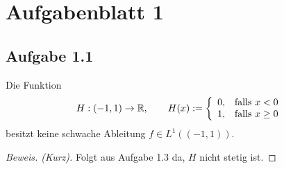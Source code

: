 
\section{Aufgabenblatt 1}
\subsection{Aufgabe 1.1}
Die Funktion
\begin{align*}
	H:(-1,1)\to\mathbb{R},\qquad H(x):=\left\lbrace\begin{array}{cl}
		0, & \text{falls } x<0\\
		1, & \text{falls } x\geq0
	\end{array}\right.
\end{align*}
besitzt keine schwache Ableitung $f\in L^1((-1,1))$.

\begin{proof}[Beweis. (Kurz)]
	Folgt aus Aufgabe 1.3 da, $H$ nicht stetig ist.
\end{proof}

